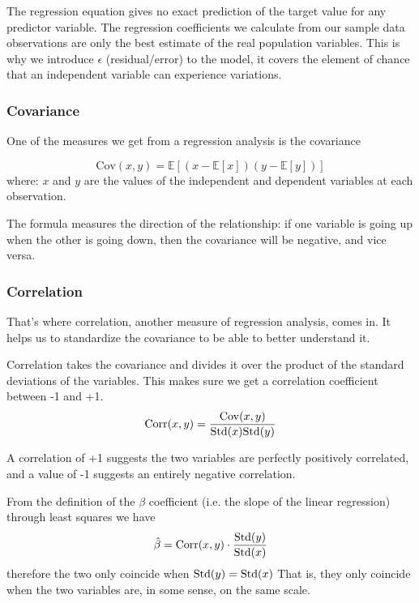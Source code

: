 The regression equation gives no exact prediction of the target value for any predictor variable. The regression coefficients we calculate from our sample data observations are only the best estimate of the real population variables.
This is why we introduce $\epsilon$ (residual/error) to the model, it covers the element of chance that an independent variable can experience variations.

\subsubsection{Covariance}
One of the measures we get from a regression analysis is the covariance

\begin{equation}
\text{Cov}(x, y) = \mathbb{E}[(x - \mathbb{E}[x])(y - \mathbb{E}[y])]
\end{equation}
where: $x$ and $y$ are the values of the independent and dependent variables at each observation.

The formula measures the direction of the relationship: if one variable is going up when the other is going down, then the covariance will be negative, and vice versa.

\subsubsection{Correlation}
That’s where correlation, another measure of regression analysis, comes in. It helps us to standardize the covariance to be able to better understand it.

Correlation takes the covariance and divides it over the product of the standard deviations of the variables. This makes sure we get a correlation coefficient between -1 and +1.
\begin{equation}
\text{Corr}(x, y) = \frac{\operatorname{Cov}(x, y)}{\text{Std}(x)\text{Std}(y)}
\end{equation}

A correlation of +1 suggests the two variables are perfectly positively correlated, and a value of -1 suggests an entirely negative correlation.

From the definition of the $\beta$ coefficient (i.e. the slope of the linear regression) through least squares we have
\begin{equation}
\hat{\beta} = \text{Corr}(x, y)\cdot \frac{\text{Std}(y)}{\text{Std}(x)}
\end{equation}
therefore the two only coincide when $\text{Std}(y) = \text{Std}(x)$ That is, they only coincide when the two variables are, in some sense, on the same scale.


